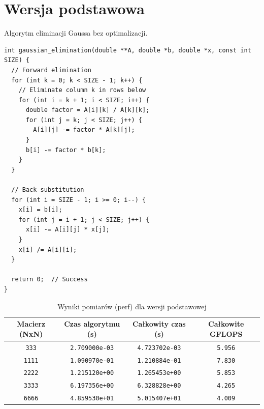 \documentclass[12pt]{article}
\begin{document}
\newpage








\section*{Wersja podstawowa}
Algorytm eliminacji Gaussa bez optimalizacji. 
\begin{verbatim}
int gaussian_elimination(double **A, double *b, double *x, const int SIZE) {
  // Forward elimination
  for (int k = 0; k < SIZE - 1; k++) {
    // Eliminate column k in rows below
    for (int i = k + 1; i < SIZE; i++) {
      double factor = A[i][k] / A[k][k];
      for (int j = k; j < SIZE; j++) {
        A[i][j] -= factor * A[k][j];
      }
      b[i] -= factor * b[k];
    }
  }

  // Back substitution
  for (int i = SIZE - 1; i >= 0; i--) {
    x[i] = b[i];
    for (int j = i + 1; j < SIZE; j++) {
      x[i] -= A[i][j] * x[j];
    }
    x[i] /= A[i][i];
  }

  return 0;  // Success
}
\end{verbatim}

\begin{table}[H]
  \centering
  \begin{tabular}{|c|c|c|c|}
    \hline
    \textbf{Macierz (NxN)} & \textbf{Czas algorytmu (s)} & \textbf{Całkowity czas (s)} & \textbf{Całkowite GFLOPS} \\
    \hline
    \verb|333|  & \verb|2.709000e-03| & \verb|4.723702e-03| & \verb|5.956| \\
    \hline
    \verb|1111| & \verb|1.090970e-01| & \verb|1.210884e-01| & \verb|7.830| \\
    \hline
    \verb|2222| & \verb|1.215120e+00| & \verb|1.265453e+00| & \verb|5.853| \\
    \hline
    \verb|3333| & \verb|6.197356e+00| & \verb|6.328828e+00| & \verb|4.265| \\
    \hline
    \verb|6666| & \verb|4.859530e+01| & \verb|5.015407e+01| & \verb|4.009| \\
    \hline
  \end{tabular}
  \caption{Wyniki pomiarów (perf) dla wersji podstawowej}
\end{table}

\newpage
\end{document}

